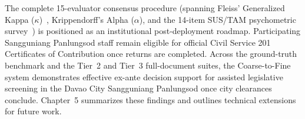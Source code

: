 The complete 15-evaluator consensus procedure (spanning Fleiss' Generalized Kappa ($\kappa$)~\cite{fleiss1971measuring,mchugh2012interrater}, Krippendorff's Alpha ($\alpha$), and the 14-item SUS/TAM psychometric survey~\cite{brooke1996sus,davis1989perceived}) is positioned as an institutional post-deployment roadmap. Participating Sangguniang Panlungsod staff remain eligible for official Civil Service 201 Certificates of Contribution once returns are completed. Across the ground-truth benchmark and the Tier~2 and Tier~3 full-document suites, the Coarse-to-Fine system demonstrates effective ex-ante decision support for assisted legislative screening in the Davao City Sangguniang Panlungsod once city clearances conclude. Chapter~5 summarizes these findings and outlines technical extensions for future work.
